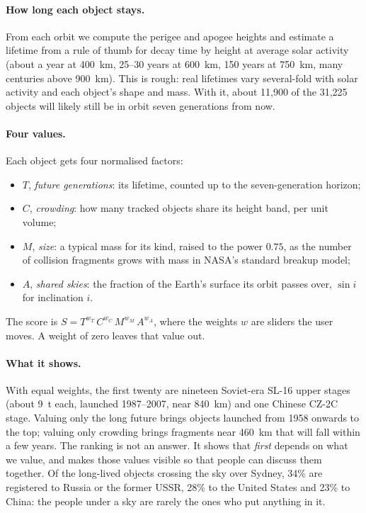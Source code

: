 \documentclass[11pt,a4paper]{article}
\begin{document}
\paragraph{How long each object stays.} From each orbit we compute the perigee and apogee heights and estimate a lifetime from a rule of thumb for decay time by height at average solar activity (about a year at 400~km, 25--30 years at 600~km, 150 years at 750~km, many centuries above 900~km). This is rough: real lifetimes vary several-fold with solar activity and each object's shape and mass. With it, about 11{,}900 of the 31{,}225 objects will likely still be in orbit seven generations from now.

\paragraph{Four values.} Each object gets four normalised factors:
\begin{itemize}\itemsep1pt
\item $T$, \emph{future generations}: its lifetime, counted up to the seven-generation horizon;
\item $C$, \emph{crowding}: how many tracked objects share its height band, per unit volume;
\item $M$, \emph{size}: a typical mass for its kind, raised to the power $0.75$, as the number of collision fragments grows with mass in NASA's standard breakup model;
\item $A$, \emph{shared skies}: the fraction of the Earth's surface its orbit passes over, $\sin i$ for inclination $i$.
\end{itemize}
The score is $S = T^{w_T}\,C^{w_C}\,M^{w_M}\,A^{w_A}$, where the weights $w$ are sliders the user moves. A weight of zero leaves that value out.

\paragraph{What it shows.} With equal weights, the first twenty are nineteen Soviet-era SL-16 upper stages (about 9~t each, launched 1987--2007, near 840~km) and one Chinese CZ-2C stage. Valuing only the long future brings objects launched from 1958 onwards to the top; valuing only crowding brings fragments near 460~km that will fall within a few years. The ranking is not an answer. It shows that \emph{first} depends on what we value, and makes those values visible so that people can discuss them together. Of the long-lived objects crossing the sky over Sydney, 34\% are registered to Russia or the former USSR, 28\% to the United States and 23\% to China: the people under a sky are rarely the ones who put anything in it.
\end{document}

